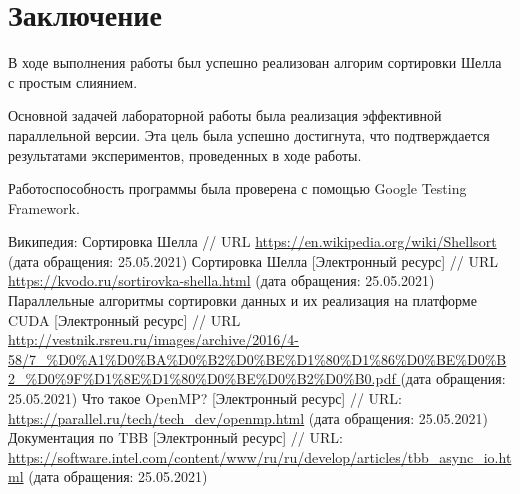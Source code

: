 \documentclass{report}
\begin{document}
\newpage

\section*{Заключение}
В ходе выполнения работы был успешно реализован алгорим сортировки Шелла с простым слиянием.

Основной задачей лабораторной работы была реализация эффективной параллельной версии. Эта цель была успешно достигнута, что подтверждается результатами экспериментов, проведенных в ходе работы.

Работоспособность программы была проверена с помощью Google Testing Framework.

\newpage

\begin{thebibliography}{1}
 Википедия: Сортировка Шелла // URL \url {https://en.wikipedia.org/wiki/Shellsort} (дата обращения: 25.05.2021)
 Сортировка Шелла [Электронный ресурс] // URL \url {https://kvodo.ru/sortirovka-shella.html} (дата обращения: 25.05.2021)
 Параллельные алгоритмы сортировки данных и их реализация на платформе CUDA [Электронный ресурс] // URL \url {http://vestnik.rsreu.ru/images/archive/2016/4-58/7_%D0%A1%D0%BA%D0%B2%D0%BE%D1%80%D1%86%D0%BE%D0%B2_%D0%9F%D1%8E%D1%80%D0%BE%D0%B2%D0%B0.pdf } (дата обращения: 25.05.2021)
Что такое OpenMP? [Электронный ресурс] // URL: \url { https://parallel.ru/tech/tech_dev/openmp.html} (дата обращения: 25.05.2021)
Документация по TBB [Электронный ресурс] // URL: \url {https://software.intel.com/content/www/ru/ru/develop/articles/tbb_async_io.html} (дата обращения: 25.05.2021)
\end{thebibliography}
\newpage

\end{document}
